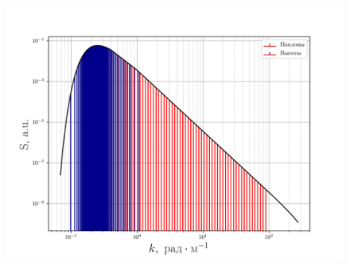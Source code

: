 \documentclass[a4paper,14pt]{extarticle}
\renewcommand{\qty}{ }
\begin{document}
\begin{figure}[ht]
    \centering
    \includegraphics[width=0.6\linewidth]{fig/fig3}
    \caption{}
    \label{fig:}
\end{figure}





\end{document}
